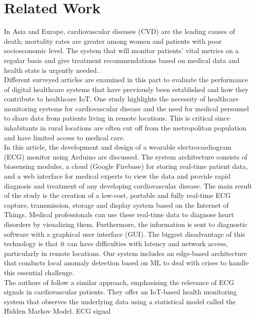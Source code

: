 \documentclass{bmcart}
\begin{document}
\section*{Related Work}
In Asia and Europe, cardiovascular diseases (CVD) are the leading causes of
death; mortality rates are greater among women and patients with poor
socioeconomic level. The system that will monitor patients' vital metrics on a
regular basis and give treatment recommendations based on medical data and
health state is urgently needed.\cite{app12010519}.\\
Different surveyed articles are examined in this part to evaluate the
performance of digital healthcare systems that have previously been established
and how they contribute to healthcare IoT. One study \cite{Varshney2019IoTBE}
highlights the necessity of healthcare monitoring systems for cardiovascular
disease and the need for medical personnel to share data from patients living in
remote locations. This is critical since inhabitants in rural locations are
often cut off from the metropolitan population and have limited access to
medical care.\\
In this article, the development and design of a wearable electrocardiogram
(ECG) monitor using Arduino are discussed. The system architecture consists of
biosensing modules, a cloud (Google Firebase) for storing real-time patient
data, and a web interface for medical experts to view the data and provide rapid
diagnosis and treatment of any developing cardiovascular disease. The main
result of the study is the creation of a low-cost, portable and fully real-time
ECG capture, transmission, storage and display system based on the Internet of
Things. Medical professionals can use these real-time data to diagnose heart
disorders by visualizing them. Furthermore, the information is sent to
diagnostic software with a graphical user interface (GUI). The biggest
disadvantage of this technology is that it can have difficulties with latency
and network access, particularly in remote locations. Our system includes an
edge-based architecture that conducts local anomaly detection based on ML to
deal with crises to handle this essential challenge.\\
The authors of \cite{0a1fa6938fc34df1a7b0b24631b3a22c} follow a similar
approach, emphasising the relevance of ECG signals in cardiovascular patients.
They offer an IoT-based health monitoring system that observes the underlying
data using a statistical model called the Hidden Markov Model. ECG signal
\end{document}
